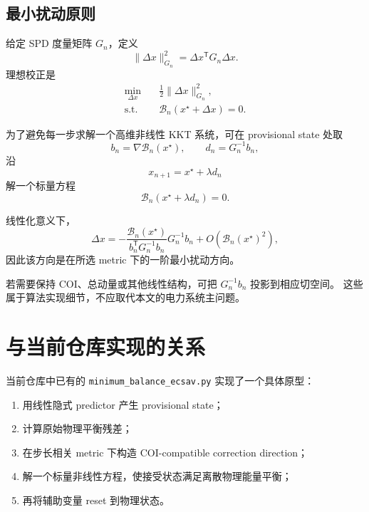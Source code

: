 \documentclass[UTF8,11pt,a4paper]{ctexart}
\newcommand{\T}{\mathsf{T}}
\newcommand{\B}{\mathcal B}
\begin{document}
\subsection{最小扰动原则}

给定 SPD 度量矩阵 \(G_n\)，定义
\begin{equation}
  \|\Delta x\|_{G_n}^2
  =
  \Delta x^\T G_n\Delta x.
\end{equation}
理想校正是
\begin{equation}
\begin{aligned}
  \min_{\Delta x}\quad&
  \frac12\|\Delta x\|_{G_n}^2,\\
  \text{s.t.}\quad&
  \B_n(x^\star+\Delta x)=0.
\end{aligned}
\label{eq:nearest-projection}
\end{equation}

为了避免每一步求解一个高维非线性 KKT 系统，可在 provisional state 处取
\begin{equation}
  b_n=\nabla\B_n(x^\star),
  \qquad
  d_n=G_n^{-1}b_n,
\end{equation}
沿
\begin{equation}
  x_{n+1}=x^\star+\lambda d_n
  \label{eq:scalar-correction}
\end{equation}
解一个标量方程
\begin{equation}
  \B_n(x^\star+\lambda d_n)=0.
  \label{eq:scalar-root}
\end{equation}

线性化意义下，
\begin{equation}
  \Delta x
  =
  -\frac{\B_n(x^\star)}
  {b_n^\T G_n^{-1}b_n}
  G_n^{-1}b_n
  +O(\B_n(x^\star)^2),
\end{equation}
因此该方向是在所选 metric 下的一阶最小扰动方向。

若需要保持 COI、总动量或其他线性结构，可把 \(G_n^{-1}b_n\) 投影到相应切空间。
这些属于算法实现细节，不应取代本文的电力系统主问题。

\section{与当前仓库实现的关系}

当前仓库中已有的
\texttt{minimum\_balance\_ecsav.py}
实现了一个具体原型：
\begin{enumerate}[label=(\arabic*)]
  \item 用线性隐式 predictor 产生 provisional state；
  \item 计算原始物理平衡残差；
  \item 在步长相关 metric 下构造 COI-compatible correction direction；
  \item 解一个标量非线性方程，使接受状态满足离散物理能量平衡；
  \item 再将辅助变量 reset 到物理状态。
\end{enumerate}
\end{document}
